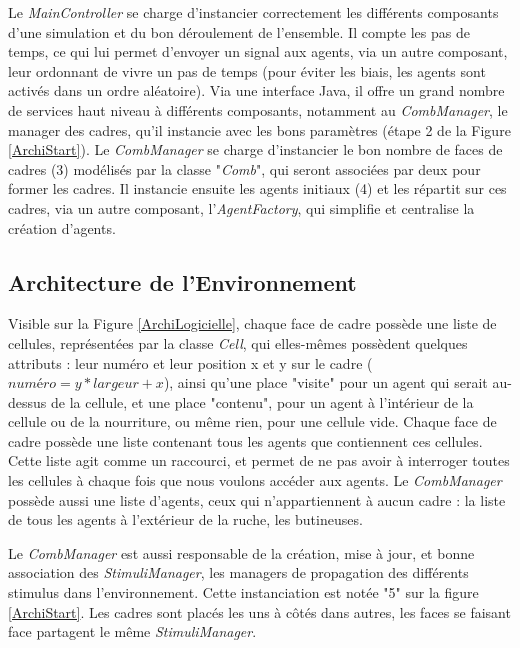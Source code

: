 			Le \textit{MainController} se charge d'instancier correctement les différents composants d'une simulation et du bon déroulement de l'ensemble. Il compte les pas de temps, ce qui lui permet d'envoyer un signal aux agents, via un autre composant, leur ordonnant de vivre un pas de temps (pour éviter les biais, les agents sont activés dans un ordre aléatoire). Via une interface Java, il offre un grand nombre de services haut niveau à différents composants, notamment au \textit{CombManager}, le manager des cadres, qu'il instancie avec les bons paramètres (étape 2 de la Figure \ref{ArchiStart}). Le \textit{CombManager} se charge d'instancier le bon nombre de faces de cadres (3) modélisés par la classe "\textit{Comb}", qui seront associées par deux pour former les cadres. Il instancie ensuite les agents initiaux (4) et les répartit sur ces cadres, via un autre composant, l'\textit{AgentFactory}, qui simplifie et centralise la création d'agents.
			
			\subsection{Architecture de l'Environnement}
			Visible sur la Figure \ref{ArchiLogicielle}, chaque face de cadre possède une liste de cellules, représentées par la classe \textit{Cell}, qui elles-mêmes possèdent quelques attributs : leur numéro et leur position x et y sur le cadre ($numéro = y * largeur + x$), ainsi qu'une place "visite" pour un agent qui serait au-dessus de la cellule, et une place "contenu", pour un agent à l'intérieur de la cellule ou de la nourriture, ou même rien, pour une cellule vide. Chaque face de cadre possède une liste contenant tous les agents que contiennent ces cellules. Cette liste agit comme un raccourci, et permet de ne pas avoir à interroger toutes les cellules à chaque fois que nous voulons accéder aux agents. Le \textit{CombManager} possède aussi une liste d'agents, ceux qui n'appartiennent à aucun cadre : la liste de tous les agents à l'extérieur de la ruche, les butineuses.
			
			Le \textit{CombManager} est aussi responsable de la création, mise à jour, et bonne association des \textit{StimuliManager}, les managers de propagation des différents stimulus dans l'environnement. Cette instanciation est notée "5" sur la figure \ref{ArchiStart}. Les cadres sont placés les uns à côtés dans autres, les faces se faisant face partagent le même \textit{StimuliManager}. 
			
